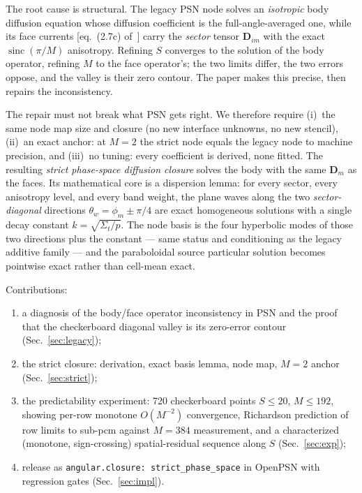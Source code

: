 \documentclass[11pt,a4paper]{article}
\begin{document}
The root cause is structural.  The legacy PSN node solves an
\emph{isotropic} body diffusion equation whose diffusion coefficient
is the full-angle-averaged one, while its face currents
[eq.~(2.7c) of~\cite{chao2027}] carry the \emph{sector} tensor
$\bm{D}_{im}$ with the exact $\operatorname{sinc}(\pi/M)$ anisotropy.
Refining $S$ converges to the solution of the body operator, refining
$M$ to the face operator's; the two limits differ, the two errors
oppose, and the valley is their zero contour.  The paper makes this
precise, then repairs the inconsistency.

The repair must not break what PSN gets right.  We therefore require
(i)~the same node map size and closure (no new interface unknowns, no
new stencil), (ii)~an exact anchor: at $M=2$ the strict node equals
the legacy node to machine precision, and (iii)~no tuning: every
coefficient is derived, none fitted.  The resulting \emph{strict
phase-space diffusion closure} solves the body with the same $\bm{D}_m$
as the faces.  Its mathematical core is a dispersion lemma: for every
sector, every anisotropy level, and every band weight, the plane waves
along the two \emph{sector-diagonal} directions
$\theta_w = \phi_m \pm \pi/4$ are exact homogeneous solutions with a
single decay constant $k=\sqrt{\Sigma_t/p}$.  The node basis is the
four hyperbolic modes of those two directions plus the constant ---
same status and conditioning as the legacy additive family --- and the
paraboloidal source particular solution becomes pointwise exact rather
than cell-mean exact.

Contributions:
\begin{enumerate}
\item a diagnosis of the body/face operator inconsistency in PSN and
the proof that the checkerboard diagonal valley is its zero-error
contour (Sec.~\ref{sec:legacy});
\item the strict closure: derivation, exact basis lemma, node map,
$M=2$ anchor (Sec.~\ref{sec:strict});
\item the predictability experiment: 720 checkerboard points
$S\le20$, $M\le192$, showing per-row monotone $O(M^{-2})$ convergence,
Richardson prediction of row limits to sub-pcm against $M=384$
measurement, and a characterized (monotone, sign-crossing)
spatial-residual sequence along $S$ (Sec.~\ref{sec:exp});
\item release as \texttt{angular.closure: strict\_phase\_space} in
OpenPSN with regression gates (Sec.~\ref{sec:impl}).
\end{enumerate}
\end{document}

